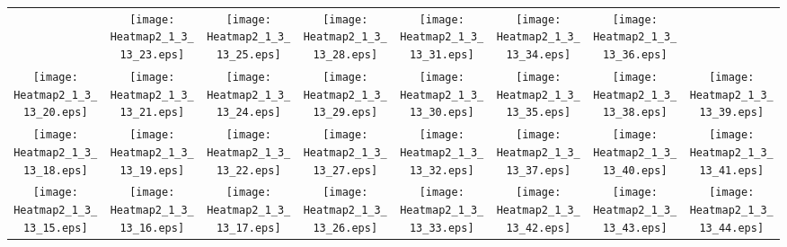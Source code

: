 \documentclass{standalone}
\begin{document}
\renewcommand{\arraystretch}{0}
\setlength{\tabcolsep}{0pt}
\begin{tabular}{ *8{c} }
 & \texttt{[image: Heatmap2\_1\_3\_13\_23.eps]} & \texttt{[image: Heatmap2\_1\_3\_13\_25.eps]} & \texttt{[image: Heatmap2\_1\_3\_13\_28.eps]} & \texttt{[image: Heatmap2\_1\_3\_13\_31.eps]} & \texttt{[image: Heatmap2\_1\_3\_13\_34.eps]} & \texttt{[image: Heatmap2\_1\_3\_13\_36.eps]} &  \\
\texttt{[image: Heatmap2\_1\_3\_13\_20.eps]} & \texttt{[image: Heatmap2\_1\_3\_13\_21.eps]} & \texttt{[image: Heatmap2\_1\_3\_13\_24.eps]} & \texttt{[image: Heatmap2\_1\_3\_13\_29.eps]} & \texttt{[image: Heatmap2\_1\_3\_13\_30.eps]} & \texttt{[image: Heatmap2\_1\_3\_13\_35.eps]} & \texttt{[image: Heatmap2\_1\_3\_13\_38.eps]} & \texttt{[image: Heatmap2\_1\_3\_13\_39.eps]} \\
\texttt{[image: Heatmap2\_1\_3\_13\_18.eps]} & \texttt{[image: Heatmap2\_1\_3\_13\_19.eps]} & \texttt{[image: Heatmap2\_1\_3\_13\_22.eps]} & \texttt{[image: Heatmap2\_1\_3\_13\_27.eps]} & \texttt{[image: Heatmap2\_1\_3\_13\_32.eps]} & \texttt{[image: Heatmap2\_1\_3\_13\_37.eps]} & \texttt{[image: Heatmap2\_1\_3\_13\_40.eps]} & \texttt{[image: Heatmap2\_1\_3\_13\_41.eps]} \\
\texttt{[image: Heatmap2\_1\_3\_13\_15.eps]} & \texttt{[image: Heatmap2\_1\_3\_13\_16.eps]} & \texttt{[image: Heatmap2\_1\_3\_13\_17.eps]} & \texttt{[image: Heatmap2\_1\_3\_13\_26.eps]} & \texttt{[image: Heatmap2\_1\_3\_13\_33.eps]} & \texttt{[image: Heatmap2\_1\_3\_13\_42.eps]} & \texttt{[image: Heatmap2\_1\_3\_13\_43.eps]} & \texttt{[image: Heatmap2\_1\_3\_13\_44.eps]} \\

\end{tabular}
\end{document}
